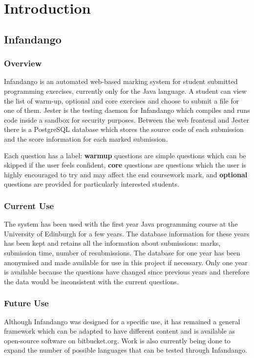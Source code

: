 \chapter{Introduction}
\label{introduction}

\section{Infandango}
\subsection{Overview}
Infandango\cite{infandango_note} is an automated web-based marking system for student submitted programming exercises, currently only for the Java language. A student can view the list of warm-up, optional and core exercises and choose to submit a file for one of them. Jester is the testing daemon for Infandango which compiles and runs code inside a sandbox for security purposes. Between the web frontend and Jester there is a PostgreSQL database which stores the source code of each submission and the score information for each marked submission.

Each question has a label: {\bf warmup} questions are simple questions which can be skipped if the user feels confident, {\bf core} questions are questions which the user is highly encouraged to try and may affect the end coursework mark, and {\bf optional} questions are provided for particularly interested students.

\subsection{Current Use}
The system has been used with the first year Java programming course at the University of Edinburgh for a few years. The database information for these years has been kept and retains all the information about submissions: marks, submission time, number of resubmissions. The database for one year has been anonymised and made available for use in this project if necessary. Only one year is available because the questions have changed since previous years and therefore the data would be inconsistent with the current questions.

\subsection{Future Use}
Although Infandango was designed for a specific use, it has remained a general framework which can be adapted to have different content and is available as open-source software on bitbucket.org\cite{bitbucket}. Work is also currently being done to expand the number of possible languages that can be tested through Infandango\cite{bitbucket_james}.

